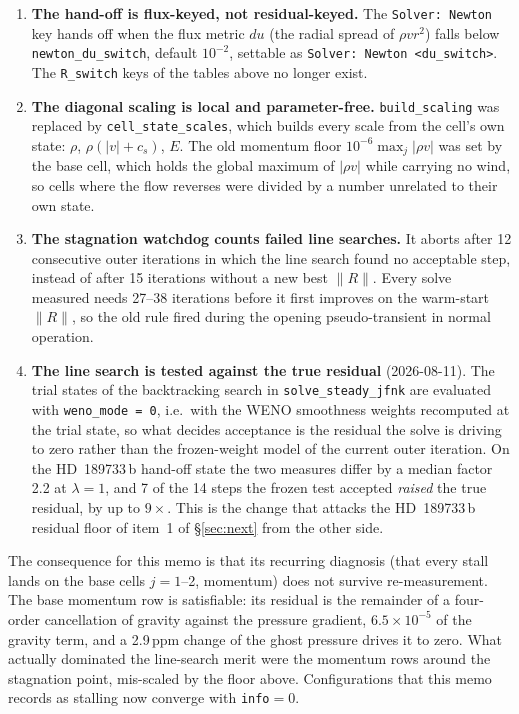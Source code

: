 \documentclass[english,a4paper]{my_memo}
\newcommand{\code}[1]{\texttt{#1}}
\begin{document}
\begin{enumerate}
\item \textbf{The hand-off is flux-keyed, not residual-keyed.} The
  \code{Solver: Newton} key hands off when the flux metric $du$ (the radial
  spread of $\rho v r^2$) falls below \code{newton\_du\_switch}, default
  $10^{-2}$, settable as \code{Solver: Newton <du\_switch>}. The
  \code{R\_switch} keys of the tables above no longer exist.

\item \textbf{The diagonal scaling is local and parameter-free.}
  \code{build\_scaling} was replaced by \code{cell\_state\_scales}, which builds
  every scale from the cell's own state: $\rho$, $\rho(|v|+c_s)$, $E$. The old
  momentum floor $10^{-6}\max_j|\rho v|$ was set by the base cell, which holds
  the global maximum of $|\rho v|$ while carrying no wind, so cells where the
  flow reverses were divided by a number unrelated to their own state.

\item \textbf{The stagnation watchdog counts failed line searches.} It aborts
  after 12 consecutive outer iterations in which the line search found no
  acceptable step, instead of after 15 iterations without a new best $\|R\|$.
  Every solve measured needs 27--38 iterations before it first improves on the
  warm-start $\|R\|$, so the old rule fired during the opening pseudo-transient
  in normal operation.

\item \textbf{The line search is tested against the true residual}
  (2026-08-11). The trial states of the backtracking search in
  \code{solve\_steady\_jfnk} are evaluated with \code{weno\_mode = 0}, i.e.\
  with the WENO smoothness weights recomputed at the trial state, so what
  decides acceptance is the residual the solve is driving to zero rather than
  the frozen-weight model of the current outer iteration. On the
  HD~189733\,b hand-off state the two measures differ by a median factor 2.2
  at $\lambda=1$, and 7 of the 14 steps the frozen test accepted \emph{raised}
  the true residual, by up to $9\times$. This is the change that attacks the
  HD~189733\,b residual floor of item~1 of \S\ref{sec:next} from the other
  side.
\end{enumerate}

The consequence for this memo is that its recurring diagnosis (that every
stall lands on the base cells $j=1$--2, momentum) does not survive
re-measurement. The base momentum row is satisfiable: its residual is the
remainder of a four-order cancellation of gravity against the pressure gradient,
$6.5\times10^{-5}$ of the gravity term, and a 2.9\,ppm change of the ghost
pressure drives it to zero. What actually dominated the line-search merit were
the momentum rows around the stagnation point, mis-scaled by the floor above.
Configurations that this memo records as stalling now converge with
\code{info}$=0$.
\end{document}
